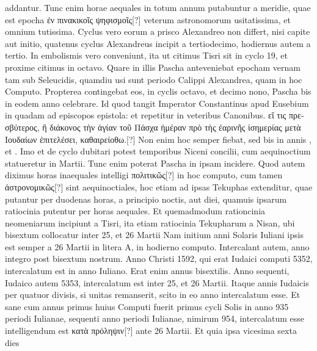 addantur.
%
Tunc enim horae aequales in totum annum putabuntur
a meridie, quae est epocha \textgreek{ἐν πινακικοῖς ψηφισμοῖς[?]}
 veterum astronomorum
usitatissima, et omnium tutissima.
Cyclus vero eorum
a prisco Alexandreo non differt, nisi capite aut initio, quatenus cyclus
Alexandreus incipit a tertiodecimo, hodiernus autem a tertio.
In embolismis vero conveniunt, ita ut citimus Tisri sit in cyclo 19, et
proxime citimus in octavo.
Quare in illis Pascha anteveniebat epocham
vernam tam sub Seleucidis, quamdiu usi sunt periodo Calippi
Alexandrea, quam in hoc Computo.
Propterea contingebat eos, in
cyclis octavo, et decimo nono, Pascha bis in eodem anno celebrare.
Id quod tangit Imperator Constantinus apud Eusebium in quadam
ad episcopos epistola: et repetitur in veteribus Canonibus.
\textgreek{εἴ τις πρεσβύτερος,
ἢ διάκονος τὴν ἁγίαν τοῦ Πάσχα ἡμέραν πρὸ τὴς ἐαρινῆς ἰσημερίας μετὰ
Ιουδαίων ἐπιτελέσει, καθαιρείοθω.[?]}
Non enim hoc semper fiebat, sed bis in annis
, et .
Imo et de  cyclo dubitari potest temporibus Niceni
concilii, cum aequinoctium %
 statueretur in  Martii.
Tunc enim
poterat Pascha in ipsam  incidere.
Quod autem diximus horas
inaequales intelligi \textgreek{πολιτικῶς[?]} in hoc computo,
 cum tamen \textgreek{ἀστρονομικῶς[?]}
sint aequinoctiales, hoc etiam ad ipsas Tekuphas extenditur, quae
putantur per duodenas horas, a principio noctis, aut diei, quamuis
ipsarum ratiocinia putentur per horas aequales.
Et quemadmodum
rationcinia neomeniarum incipiunt a Tisri, ita etiam ratiocinia Tekupharum
a Nisan, ubi bisextum collocatur inter 25, et 26 Martii
Nam initium anni Solaris Iuliani ipsis est semper a 26 Martii
in litera \textsc{A}, in hodierno computo.
Intercalant autem, anno integro
post bisextum nostrum.
Anno Christi 1592, qui erat Iudaici computi
5352, intercalatum est in anno Iuliano.
Erat enim annus bisextilis.
Anno sequenti, Iudaico autem 5353, intercalatum est inter
25, et 26 Martii.
Itaque annis Iudaicis per quatuor divisis, si unitas remanserit,
scito in eo anno intercalatum esse.
Et sane cum annus primus huius
Computi fuerit primus cycli Solis in anno 935 periodi Iulianae, sequenti
anno periodi Iulianae, nimirum 954, intercalatum esse intelligendum
est \textgreek{κατὰ πρόληψιν[?]} ante 26 Martii.
Et quia ipsa vicesima sexta dies

